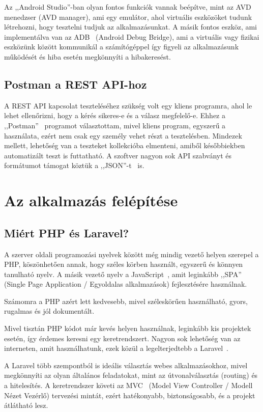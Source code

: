 \documentclass[
]{thesis-ekf}
\theoremstyle{definition}
\theoremstyle{remark}
\begin{document}
	Az ,,Android Studio''-ban olyan fontos funkciók vannak beépítve, mint az AVD~\cite{androidStudioAvd_doc} menedzser (AVD manager), ami egy emulátor, ahol virtuális eszközöket tudunk létrehozni, hogy tesztelni tudjuk az alkalmazásunkat. A másik fontos eszköz, ami implementálva van az ADB~\cite{androidStudioAdb_doc} (Android Debug Bridge), ami a virtuális vagy fizikai eszközünk között kommunikál a számítógéppel így figyeli az alkalmazásunk működését és hiba esetén megkönnyíti a hibakeresést. 
	
	\section{Postman a REST API-hoz}
	A REST API kapcsolat teszteléséhez szükség volt egy kliens programra, ahol le lehet ellenőrizni, hogy a kérés sikeres-e és a válasz megfelelő-e. Ehhez a ,,Postman''~\cite{postman_doc} programot választottam, mivel kliens program, egyszerű a használata, ezért nem csak egy személy vehet részt a tesztelésben. Mindezek mellett, lehetőség van a teszteket kollekcióba elmenteni, amiből későbbiekben automatizált teszt is futtatható. A szoftver nagyon sok API szabványt és formátumot támogat köztük a ,,JSON''-t~\cite{json_doc} is.
	
	\chapter{Az alkalmazás felépítése}
	\section{Miért PHP és Laravel?}
	A szerver oldali programozási nyelvek között még mindig vezető helyen szerepel a PHP, köszönhetően annak, hogy széles körben használt, egyszerű és könnyen tanulható nyelv. A másik vezető nyelv a JavaScript~\cite{js_book}, amit leginkább ,,SPA'' (Single Page Application / Egyoldalas alkalmazások) fejlesztésére használnak. 
	
	Számomra a PHP azért lett kedvesebb, mivel széleskörűen használható, gyors, rugalmas és jól dokumentált. 
	
	Mivel tisztán PHP kódot már kevés helyen használnak, leginkább kis projektek esetén, így érdemes keresni egy keretrendszert. Nagyon sok lehetőség van az interneten,
	amit használhatunk, ezek közül a legelterjedtebb a Laravel~\cite{laravel_book}. 
	
	A Laravel több szempontból is ideális választás webes alkalmazásokhoz, mivel megkönnyíti az olyan általános feladatokat, mint az útvonalválasztás (routing) és a hitelesítés. A keretrendszer követi az MVC~\cite{mvc_pattern} (Model View Controller / Modell Nézet Vezérlő) tervezési mintát, ezért hatékonyabb, biztonságosabb, és a projekt átlátható lesz. 
	
\end{document}
